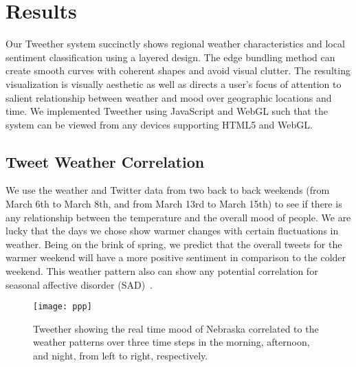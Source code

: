 \chapter{Results}

Our Tweether system succinctly shows regional weather characteristics and local sentiment classification using a layered design. The edge bundling method can create smooth curves with coherent shapes and avoid visual clutter. The resulting visualization is visually aesthetic as well as directs a user's focus of attention to salient relationship between weather and mood over geographic locations and time. We implemented Tweether using JavaScript and WebGL such that the system can be viewed from any devices supporting HTML5 and WebGL.


%


\section{Tweet Weather Correlation}

We use the weather and Twitter data from two back to back weekends (from March 6th to March 8th, and from March 13rd to March 15th) to see if there is any relationship between the temperature and the overall mood of people. We are lucky that the days we chose show warmer changes with certain fluctuations in weather. Being on the brink of spring, we predict that the overall tweets for the warmer weekend will have a more positive sentiment in comparison to the colder weekend. This weather pattern also can show any potential correlation for seasonal affective disorder (SAD)~\cite{denissen2008effects}.


\begin{figure}[t]
 \centering
 \texttt{[image: ppp]}
 \caption{Tweether showing the real time mood of Nebraska correlated to the weather patterns over three time steps in the morning, afternoon, and night, from left to right, respectively.}
 \label{fig:teaser}
\end{figure}


